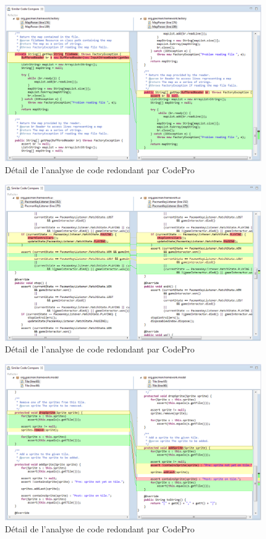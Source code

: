 \documentclass[12pt,a4paper,final]{article}
\begin{document}
\begin{figure}[ht]
	\centering
	\includegraphics[width=\textwidth]{images/SimilarCode_1.png}
	\caption{\label{SimilarCode1}Détail de l'analyse de code redondant par CodePro}
\end{figure}

\begin{figure}[ht]
	\centering
	\includegraphics[width=\textwidth]{images/SimilarCode_2.png}
	\caption{\label{SimilarCode2}Détail de l'analyse de code redondant par CodePro}
\end{figure}

\begin{figure}[ht]
	\centering
	\includegraphics[width=\textwidth]{images/SimilarCode_3.png}
	\caption{\label{SimilarCode3}Détail de l'analyse de code redondant par CodePro}
\end{figure}
\end{document}
